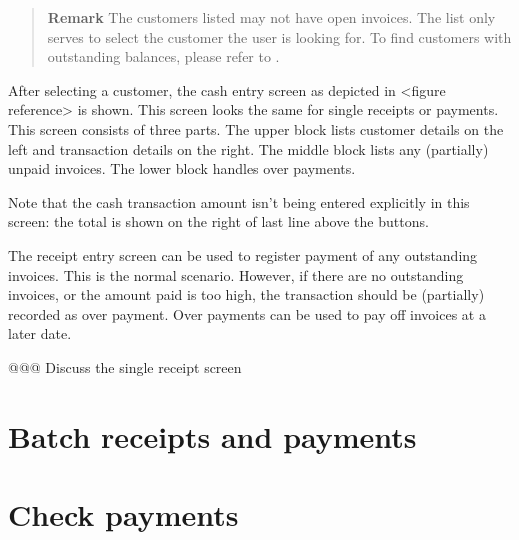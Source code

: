 \begin{quote}
\textbf{Remark} The customers listed may not have open invoices. The list only serves to select
the \gls{customer} the user is looking for. To find customers with outstanding balances, please refer to
.
\end{quote}

After selecting a \gls{customer}, the cash entry screen as depicted in <figure reference> is shown. This
screen looks the same for single receipts or payments. This screen consists of three parts. The upper
block lists customer details on the left and transaction details on the right. The middle block lists
any (partially) unpaid invoices. The lower block handles over payments.

Note that the cash transaction amount isn't being entered explicitly in this screen: the total
is shown on the right of last line above the buttons.

The receipt entry screen can be used to register payment of any outstanding invoices. This is the
normal scenario. However, if there are no outstanding invoices, or the amount paid is too high,
the transaction should be (partially) recorded as over payment. Over payments can be used to
pay off invoices at a later date.


@@@ Discuss the single receipt screen



\section{Batch receipts and payments}
\label{sec-business-processes-payment-processing-batch-payments}

\section{Check payments}
\label{sec-business-processes-payment-processing-check-payments}

